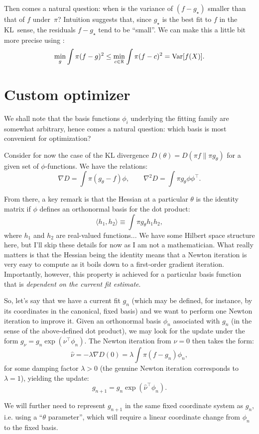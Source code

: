 \documentclass{article}
\begin{document}
Then comes a natural question: when is the variance of $(f-g_\star)$ smaller than that of $f$ under~$\pi$? Intuition suggests that, since $g_\star$ is the best fit to $f$ in the KL~sense, the residuals $f-g_\star$ tend to be ``small''. We can make this a little bit more precise using :
$$
\min_g \int \pi (f-g)^2 \leq \min_{c\in\mathbb{R}} \int \pi (f-c)^2 = {\rm Var}[f(X)].
$$


\section{Custom optimizer}

We shall note that the basis functions $\phi_i$ underlying the fitting family are somewhat arbitrary, hence comes a natural question: which basis is most convenient for optimization?

Consider for now the case of the KL divergence $D(\theta)=D(\pi f\|\pi g_\theta)$ for a given set of $\phi$-functions. We have the relations:
$$
\nabla D = \int \pi (g_\theta-f) \phi,
\qquad
\nabla^2 D = \int \pi g_\theta \phi\phi^\top.
$$

From there, a key remark is that the Hessian at a particular $\theta$ is the identity matrix if $\phi$ defines an orthonormal basis for the dot product:
$$
\langle h_1, h_2 \rangle \equiv \int \pi g_{\theta} h_1 h_2,
$$
where $h_1$ and $h_2$ are real-valued functions... We have some Hilbert space structure here, but I'll skip these details for now as I am not a mathematician. What really matters is that the Hessian being the identity means that a Newton iteration is very easy to compute as it boils down to a first-order gradient iteration. Importantly, however, this property is achieved for a particular basis function that is {\em dependent on the current fit estimate}.

So, let's say that we have a current fit $g_n$ (which may be defined, for instance, by its coordinates in the canonical, fixed basis) and we want to perform one Newton iteration to improve it. Given an orthonormal basis $\phi_n$ associated with $g_n$ (in the sense of the above-defined dot product), we may look for the update under the form $g_\nu = g_n \exp({\nu^\top \phi_n})$. The Newton iteration from $\nu=0$ then takes the form:
$$
\hat{\nu} = -\lambda \nabla D(0) = \lambda \int \pi(f - g_n)\phi_n,
$$
for some damping factor $\lambda > 0$ (the genuine Newton iteration corresponds to $\lambda=1$), yielding the update:
$$
g_{n+1} = g_n \exp (\hat{\nu}^\top \phi_n).
$$

We will further need to represent $g_{n+1}$ in the same fixed coordinate system as $g_n$, i.e. using a ``$\theta$ parameter'', which will require a linear coordinate change from $\phi_n$ to the fixed basis. 
\end{document}
